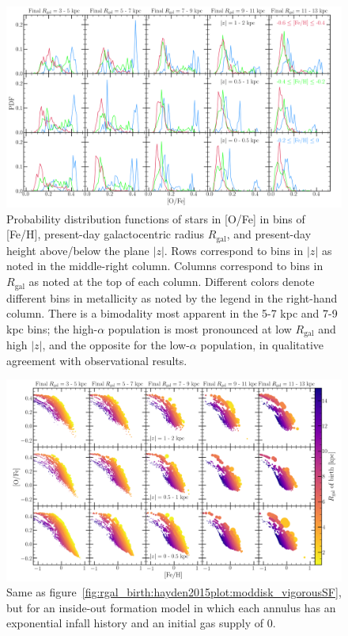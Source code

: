 \documentclass[12pt]{report}
\begin{document}
\begin{figure} 
\centering 
\includegraphics[scale = 0.3]{../plots/stellarMDFS/hayden2015plot/moddisk_vigorousSF.png} 
\caption{
Probability distribution functions of stars in [O/Fe] in bins of [Fe/H], 
present-day galactocentric radius $R_\text{gal}$, and present-day height 
above/below the plane $\left|z\right|$. Rows correspond to bins in 
$\left|z\right|$ as noted in the middle-right column. Columns correspond to 
bins in $R_\text{gal}$ as noted at the top of each column. Different colors 
denote different bins in metallicity as noted by the legend in the right-hand 
column. There is a bimodality most apparent in the 5-7 kpc and 7-9 kpc bins; 
the high-$\alpha$ population is most pronounced at low $R_\text{gal}$ and 
high $\left|z\right|$, and the opposite for the low-$\alpha$ population, 
in qualitative agreement with observational results. 
}
\end{figure} 

\begin{figure} 
\centering 
\includegraphics[scale = 0.3]{../plots/rgal_birth/hayden2015plot/iodisk_reference.png} 
\caption{
Same as figure~\ref{fig:rgal_birth:hayden2015plot:moddisk_vigorousSF}, but for 
an inside-out formation model in which each annulus has an exponential infall 
history and an initial gas supply of 0. 
}
\end{figure} 
\end{document}
